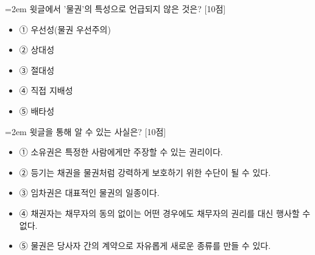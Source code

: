 \documentclass[11pt,a4paper]{article}
\newcommand{\qnum}[1]{%
  \tikz[baseline=(num.base)]{%
    \node[circle, fill=numCircle, text=white, inner sep=0pt,
          minimum size=18pt, font=\small\bfseries] (num) {#1};%
  }%
}
\newcommand{\pts}[1]{%
  \hfill\textcolor{ptsBadge}{[#1점]}%
}
\begin{document}
\vspace{4mm}
\begin{minipage}{\columnwidth}
{\hangindent=2em
\qnum{30}\enspace 윗글에서 '물권'의 특성으로 언급되지 않은 것은? \pts{10}
\par}

\vspace{3mm}
\begin{itemize}[leftmargin=2.5em, labelsep=0.3em, label={}, itemsep=4pt, parsep=1pt, topsep=0pt]
  \item ① 우선성(물권 우선주의)
  \item ② 상대성
  \item ③ 절대성
  \item ④ 직접 지배성
  \item ⑤ 배타성
\end{itemize}
\end{minipage}
\vspace{4mm}

\vspace{4mm}
\begin{minipage}{\columnwidth}
{\hangindent=2em
\qnum{31}\enspace 윗글을 통해 알 수 있는 사실은? \pts{10}
\par}

\vspace{3mm}
\begin{itemize}[leftmargin=2.5em, labelsep=0.3em, label={}, itemsep=4pt, parsep=1pt, topsep=0pt]
  \item ① 소유권은 특정한 사람에게만 주장할 수 있는 권리이다.
  \item ② 등기는 채권을 물권처럼 강력하게 보호하기 위한 수단이 될 수 있다.
  \item ③ 임차권은 대표적인 물권의 일종이다.
  \item ④ 채권자는 채무자의 동의 없이는 어떤 경우에도 채무자의 권리를 대신 행사할 수 없다.
  \item ⑤ 물권은 당사자 간의 계약으로 자유롭게 새로운 종류를 만들 수 있다.
\end{itemize}
\end{minipage}
\vspace{4mm}
\end{document}
